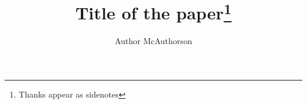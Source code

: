 \documentclass[nobib]{tufte-handout}
\title{Title of the paper\thanks{Thanks appear as sidenotes}}
\author[Author McAuthorson]{Author McAuthorson}
\begin{document}
\maketitle%

\begin{abstract}
\noindent
\lipsum[1-1]
\end{abstract}

\lipsum[2-4]

%
%
\end{document}
